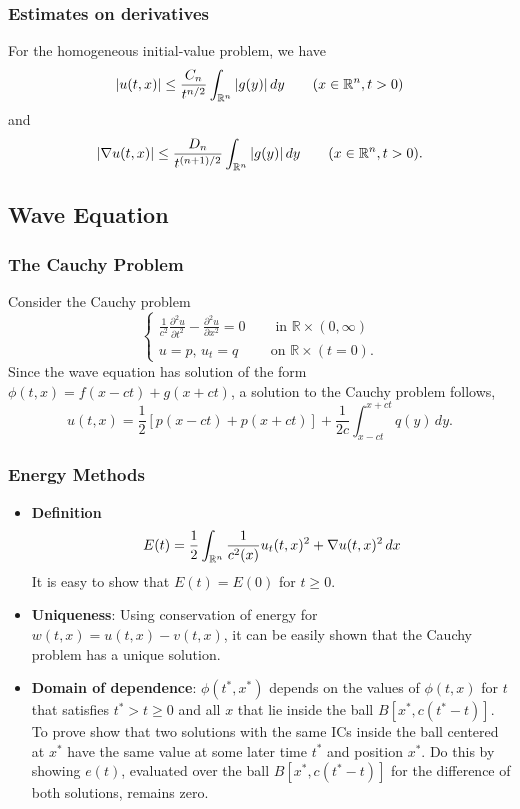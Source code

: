 \documentclass[oneside,a4paper,11pt]{report}
\begin{document}
\subsubsection{Estimates on derivatives}
For the homogeneous initial-value problem, we have
\[ |u(t,x)| \le \frac{C_n}{ t^{n/2}} \int_{{\mathbb{R}^n}} |g(y)| \,dy \qquad (x \in {\mathbb{R}^n}, t > 0) \]
and
\[ |\nabla u(t,x)| \le \frac{D_n}{t^{(n+1)/2}} \int_{{\mathbb{R}^n}} |g(y)| \,dy \qquad (x \in {\mathbb{R}^n}, t > 0). \]
 
\subsection{Wave Equation}
\subsubsection{The Cauchy Problem}
Consider the Cauchy problem
\[ \begin{cases}
\frac{1}{c^2} \frac{\partial^2 u}{\partial t^2} - \frac{\partial^2 u}{\partial x^2} = 0 \quad & \text{ in } \mathbb{R} \times (0,\infty) \\
u = p, \, u_t = q & \text{on } \mathbb{R} \times (t=0).
\end{cases} \]
Since the wave equation has solution of the form $\phi(t,x) = f(x-ct) + g(x+ct)$, a solution to the Cauchy problem follows,
\[u(t,x) = \frac{1}{2}[p(x-ct) + p(x+ct)] + \frac{1}{2c} \int_{x-ct}^{x+ct} q(y) \, dy.\]

\subsubsection{Energy Methods}
\begin{itemize}

\item \textbf{Definition}
\[E(t) = \frac{1}{2} \int_{{\mathbb{R}^n}} \frac{1}{c^2(x)} u_t(t,x)^2 + \nabla u(t,x)^2 \, dx \]
 It is easy to show that $E(t) = E(0)$ for $t\ge0$.
 
\item \textbf{Uniqueness}: Using conservation of energy for $w(t,x) = u(t,x) - v(t,x)$, it can be easily shown that the Cauchy problem has a unique solution.
 
\item \textbf{Domain of dependence}: $\phi(t^*,x^*)$ depends on the values of $\phi(t,x)$ for $t$ that satisfies $t^*> t \ge 0$ and all $x$ that lie inside the ball $B[x^*, c(t^*-t)]$. To prove show that two solutions with the same ICs inside the ball centered at $x^*$ have the same value at some later time $t^*$ and position $x^*$. Do this by showing $e(t)$, evaluated over the ball $B[x^*,c(t^*-t)]$ for the difference of both solutions, remains zero.
 
\end{itemize} 
\end{document}
